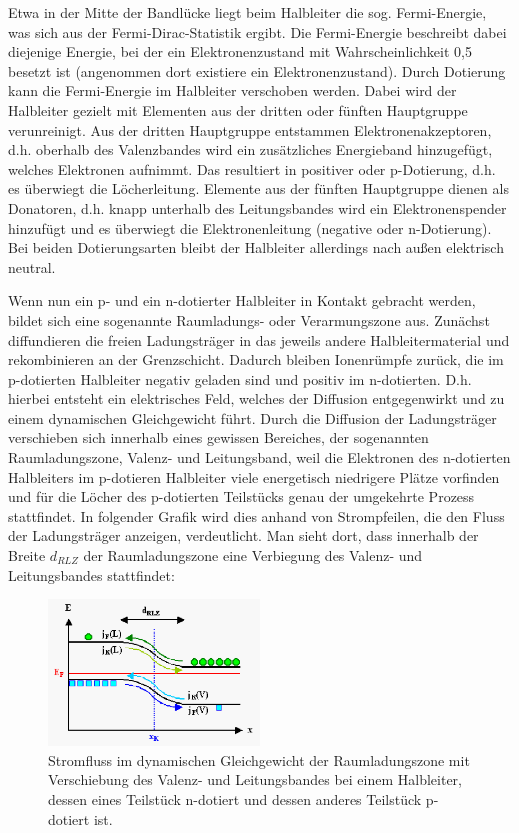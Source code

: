 \documentclass[bigchapter,colorback,accentcolor=tud4b,linedtoc,11pt]{tudreport}
\begin{document}
Etwa in der Mitte der Bandlücke liegt beim Halbleiter die sog. Fermi-Energie, was sich aus der Fermi-Dirac-Statistik ergibt. Die Fermi-Energie beschreibt dabei diejenige Energie, bei der ein Elektronenzustand mit Wahrscheinlichkeit 0,5 besetzt ist (angenommen dort existiere ein Elektronenzustand). Durch Dotierung kann die Fermi-Energie im Halbleiter verschoben werden. Dabei wird der Halbleiter gezielt mit Elementen aus der dritten oder fünften Hauptgruppe verunreinigt. Aus der dritten Hauptgruppe entstammen Elektronenakzeptoren, d.h. oberhalb des Valenzbandes wird ein zusätzliches Energieband hinzugefügt, welches Elektronen aufnimmt. Das resultiert in positiver oder p-Dotierung, d.h. es überwiegt die Löcherleitung. Elemente aus der fünften Hauptgruppe dienen als Donatoren, d.h. knapp unterhalb des Leitungsbandes wird ein Elektronenspender hinzufügt und es überwiegt die Elektronenleitung (negative oder n-Dotierung). Bei beiden Dotierungsarten bleibt der Halbleiter allerdings nach außen elektrisch neutral.
\color{black}

Wenn nun ein p- und ein n-dotierter Halbleiter in Kontakt gebracht werden, bildet sich eine sogenannte Raumladungs- oder Verarmungszone aus. Zunächst diffundieren die freien Ladungsträger in das jeweils andere Halbleitermaterial und rekombinieren an der Grenzschicht. Dadurch bleiben Ionenrümpfe zurück, die im p-dotierten Halbleiter negativ geladen sind und positiv im n-dotierten. D.h. hierbei entsteht ein elektrisches Feld, welches der Diffusion entgegenwirkt und zu einem dynamischen Gleichgewicht führt. Durch die Diffusion der Ladungsträger verschieben sich innerhalb eines gewissen Bereiches, der sogenannten Raumladungszone, Valenz- und Leitungsband, weil die Elektronen des n-dotierten Halbleiters im p-dotieren Halbleiter viele energetisch niedrigere Plätze vorfinden und für die Löcher des p-dotierten Teilstücks genau der umgekehrte Prozess stattfindet. In folgender Grafik wird dies anhand von Strompfeilen, die den Fluss der Ladungsträger anzeigen, verdeutlicht. Man sieht dort, dass innerhalb der Breite $d_{RLZ}$ der Raumladungszone eine Verbiegung des Valenz- und Leitungsbandes stattfindet:

\begin{figure}[H] 
  \centering
     \includegraphics[width=0.5\textwidth]{img/pn.jpg}
  \caption{Stromfluss im dynamischen Gleichgewicht der Raumladungszone mit Verschiebung des Valenz- und Leitungsbandes bei einem Halbleiter, dessen eines Teilstück n-dotiert und dessen anderes Teilstück p-dotiert ist. \cite{website1}}
  \label{fig:Bild1}
\end{figure}
\end{document}
